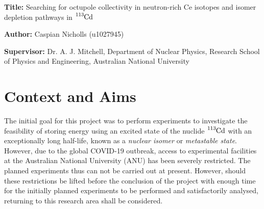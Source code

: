 \documentclass[12pt,a4paper]{article}
\begin{document}

\noindent
\textbf{Title: }Searching for octupole collectivity in neutron-rich Ce isotopes and isomer depletion pathways in $\ce{^{113}Cd}$

\noindent
\textbf{Author: } Caspian Nicholls (u1027945)

\noindent
\textbf{Supervisor: } Dr. A. J. Mitchell, Department of Nuclear Physics, Research School of Physics and Engineering, Australian National University

%
%

\section*{Context and Aims}

The initial goal for this project was to perform experiments to investigate the feasibility of storing energy using an excited state of the nuclide $\ce{^{113}Cd}$ with an exceptionally long half-life, known as a \textit{nuclear isomer} or \textit{metastable state}.
However, due to the global COVID-19 outbreak, access to experimental facilities at the Australian National University (ANU) has been severely restricted.
The planned experiments thus can not be carried out at present.
However, should these restrictions be lifted before the conclusion of the project with enough time for the initially planned experiments to be performed and satisfactorily analysed, returning to this research area shall be considered. 
\end{document}
